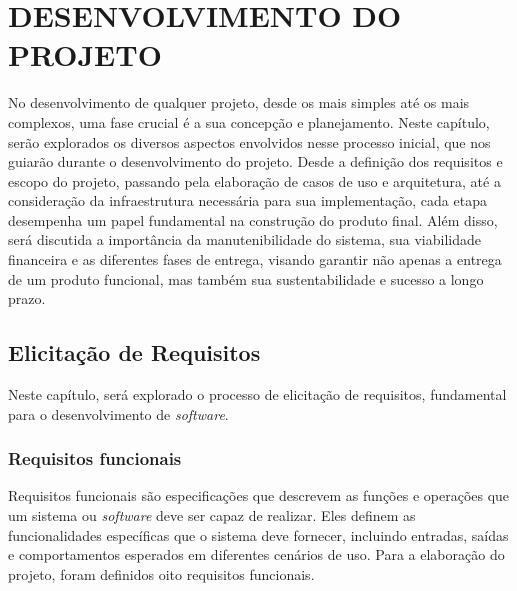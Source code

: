 \chapter{DESENVOLVIMENTO DO PROJETO}
\label{geral-requisitos-gerenciamento}

No desenvolvimento de qualquer projeto, desde os mais simples até os mais complexos, uma fase crucial é a sua concepção e planejamento. Neste capítulo, serão explorados os diversos aspectos envolvidos nesse processo inicial, que nos guiarão durante o desenvolvimento do projeto. Desde a definição dos requisitos e escopo do projeto, passando pela elaboração de casos de uso e arquitetura, até a consideração da infraestrutura necessária para sua implementação, cada etapa desempenha um papel fundamental na construção do produto final. Além disso, será discutida a importância da manutenibilidade do sistema, sua viabilidade financeira e as diferentes fases de entrega, visando garantir não apenas a entrega de um produto funcional, mas também sua sustentabilidade e sucesso a longo prazo.

\section{Elicitação de Requisitos}
Neste capítulo, será explorado o processo de elicitação de requisitos, fundamental para o desenvolvimento de \textit{software}.

\subsection{Requisitos funcionais}

Requisitos funcionais são especificações que descrevem as funções e operações que um sistema ou \textit{software} deve ser capaz de realizar. Eles definem as funcionalidades específicas que o sistema deve fornecer, incluindo entradas, saídas e comportamentos esperados em diferentes cenários de uso. Para a elaboração do projeto, foram definidos oito requisitos funcionais.

